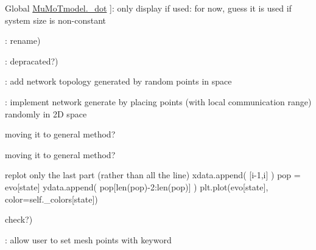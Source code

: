 \begin{DoxyRefList}
Global \hyperlink{class_mu_mo_t_1_1_mu_mo_t_1_1_mu_mo_tmodel_aaabcff4440dc0ded9f9f880c9f86c6c1}{Mu\+Mo\+Tmodel.\+\_\+dot} ]\+: only display if used\+: for now, guess it is used if system size is non-\/constant  
\item[\label{todo__todo000003}%
\Hypertarget{todo__todo000003}%
Global \hyperlink{class_mu_mo_t_1_1_mu_mo_t_1_1_mu_mo_tmodel_a795ce014c05817c0ac931270e961020f}{Mu\+Mo\+Tmodel.\+\_\+rates\+La\+TeX} ]\+: rename)  
\item[\label{todo__todo000002}%
\Hypertarget{todo__todo000002}%
Global \hyperlink{class_mu_mo_t_1_1_mu_mo_t_1_1_mu_mo_tmodel_accfd4bbcd94ec3ce4a064fec53921700}{Mu\+Mo\+Tmodel.\+\_\+reactants\+La\+TeX} ]\+: depracated?)  
\item[\label{todo__todo000024}%
\Hypertarget{todo__todo000024}%
Global \hyperlink{class_mu_mo_t_1_1_mu_mo_t_1_1_mu_mo_tmultiagent_controller_a018864aa22d2adb0d3958fb0adbce8e2}{Mu\+Mo\+Tmultiagent\+Controller.\+\_\+progress\+Bar} ]\+: add network topology generated by random points in space  
\item[\label{todo__todo000064}%
\Hypertarget{todo__todo000064}%
Global \hyperlink{class_mu_mo_t_1_1_mu_mo_t_1_1_mu_mo_tmultiagent_view_a8be9986760a86837e04718906d18d596}{Mu\+Mo\+Tmultiagent\+View.\+\_\+positions} ]\+: implement network generate by placing points (with local communication range) randomly in 2D space  
\item[\label{todo__todo000060}%
\Hypertarget{todo__todo000060}%
Global \hyperlink{class_mu_mo_t_1_1_mu_mo_t_1_1_mu_mo_tmultiagent_view_a7c4303b3e2a8784a0cc16cd523069203}{Mu\+Mo\+Tmultiagent\+View.\+\_\+rates\+Dict} ]moving it to general method? 

moving it to general method?  
\item[\label{todo__todo000062}%
\Hypertarget{todo__todo000062}%
Global \hyperlink{class_mu_mo_t_1_1_mu_mo_t_1_1_mu_mo_tmultiagent_view_ae8c8d7969b8ab8f31df9d1d1d10eabb9}{Mu\+Mo\+Tmultiagent\+View.\+\_\+visualisation\+Type} ]replot only the last part (rather than all the line) xdata.\+append( \mbox{[}i-\/1,i\mbox{]} ) pop = evo\mbox{[}state\mbox{]} ydata.\+append( pop\mbox{[}len(pop)-\/2\+:len(pop)\mbox{]} ) plt.\+plot(evo\mbox{[}state\mbox{]}, color=self.\+\_\+colors\mbox{[}state\mbox{]})  
\item[\label{todo__todo000034}%
\Hypertarget{todo__todo000034}%
Global \hyperlink{class_mu_mo_t_1_1_mu_mo_t_1_1_mu_mo_tmulti_controller_a018864aa22d2adb0d3958fb0adbce8e2}{Mu\+Mo\+Tmulti\+Controller.\+\_\+progress\+Bar} ]check?)  
\item[\label{todo__todo000039}%
\Hypertarget{todo__todo000039}%
Global \hyperlink{class_mu_mo_t_1_1_mu_mo_t_1_1_mu_mo_tnoise_view_ac83a924ad62a2461d65b5c9bf9d27453}{Mu\+Mo\+Tnoise\+View.\+\_\+show\+Fixed\+Points} ]\+: allow user to set mesh points with keyword 


\end{DoxyRefList}

